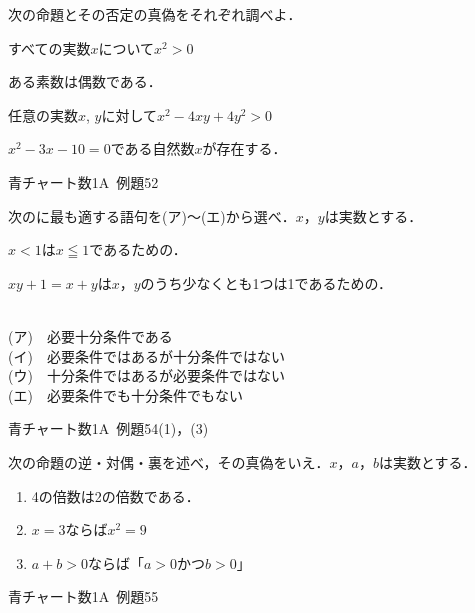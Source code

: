 \documentclass[b4paper, dvipdfmx, 11pt, fleqn, twocolumn, uplatex]{jsarticle}
\newenvironment{tabbedenum}[1]
{\NumTabs{#1}\begin{enumerate*}[label={(\arabic*)},itemjoin={\tab}]}{\end{enumerate*}}
\begin{document}

\begin{screen}
次の命題とその否定の真偽をそれぞれ調べよ．\\
\begin{tabbedenum}{1}
	\item すべての実数$x$について$x^2>0$
	\item ある素数は偶数である．
	\item 任意の実数$x$, $y$に対して$x^2-4xy+4y^2>0$
	\item $x^2-3x-10=0$である自然数$x$が存在する．
\end{tabbedenum}
\begin{flushright}
    青チャート数1A~例題52
\end{flushright}
\end{screen}


\begin{screen}
次の\fbox{\phantom{abc}}に最も適する語句を(ア)～(エ)から選べ．$x$，$y$は実数とする．\\
\begin{tabbedenum}{1}
	\item $x<1$は$x\leqq1$であるための\fbox{\phantom{abc}}．
	\item $xy+1=x+y$は$x$，$y$のうち少なくとも1つは1であるための\fbox{\phantom{abc}}．
\end{tabbedenum}\\
(ア)~~必要十分条件である\\
(イ)~~必要条件ではあるが十分条件ではない\\
(ウ)~~十分条件ではあるが必要条件ではない\\
(エ)~~必要条件でも十分条件でもない
\begin{flushright}
    青チャート数1A~例題54(1)，(3)
\end{flushright}
\end{screen}


\begin{screen}
次の命題の逆・対偶・裏を述べ，その真偽をいえ．$x$，$a$，$b$は実数とする．
\begin{enumerate}[label={(\arabic*)}]
\item 4の倍数は2の倍数である．
\item $x=3$ならば$x^2=9$
\item $a+b>0$ならば「$a>0$かつ$b>0$」
\end{enumerate}
\begin{flushright}
    青チャート数1A~例題55
\end{flushright}
\end{screen}
\end{document}
